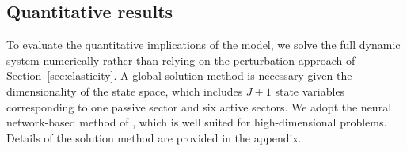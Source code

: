 \begin{table}[!t]    
    \captionsetup{font=normalsize,labelfont=bf,skip=2pt,labelsep=period}
	\caption{\textbf{Parameter values}}
	\caption*{\footnotesize{This table reports the parameter values used in calibrating the model.}}
    \vspace{2mm}
    \label{tab:calib}
    \centering
    \resizebox{.65\linewidth}{!}{}
\end{table}

\subsection{Quantitative results}

To evaluate the quantitative implications of the model, we solve the full dynamic system numerically rather than relying on the perturbation approach of Section~\ref{sec:elasticity}. A global solution method is necessary given the dimensionality of the state space, which includes $J+1$ state variables corresponding to one passive sector and six active sectors. We adopt the neural network-based method of \citet{duarte2024machine}, which is well suited for high-dimensional problems. Details of the solution method are provided in the appendix.  




